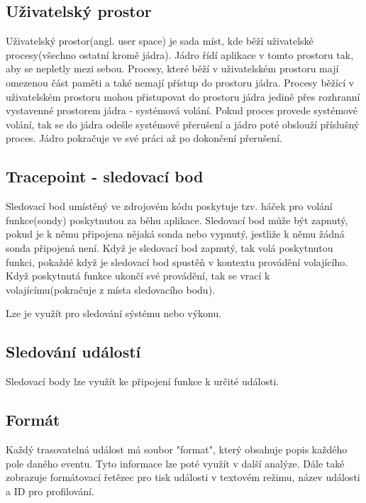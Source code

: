 \subsection*{Uživatelský prostor}
Uživatelský prostor(angl. user space) je sada míst, kde běží uživatelské procesy(všechno ostatní kromě jádra). Jádro řídí aplikace v tomto prostoru tak, aby se nepletly mezi sebou.
Procesy, které běží v uživatelském prostoru mají omezenou část paměti a také nemají přístup do prostoru jádra. Procesy běžící v uživatelském prostoru mohou přistupovat do prostoru jádra
jedině přes rozhranní vystavenné prostorem jádra - systémová volání. Pokud proces provede systémové volání, tak se do jádra odešle systémové přerušení a jádro poté obslouží
příslušný proces. Jádro pokračuje ve své práci až po dokončení přerušení.

\iffalse
www.linfo.org/kernel_space.html
\fi

\subsection{Tracepoint - sledovací bod}
Sledovací bod umístěný ve zdrojovém kódu poskytuje tzv. háček pro volání funkce(sondy) poskytnutou za běhu aplikace. Sledovací bod může
být zapnutý, pokud je k němu připojena nějaká sonda nebo vypnutý, jestliže k němu žádná sonda připojená není. Když je sledovací bod
zapnutý, tak volá poskytnutou funkci, pokaždé když je sledovací bod spustěň v kontextu provádění volajícího. Když poskytnutá funkce
ukončí své provádění, tak se vrací k volajícímu(pokračuje z místa sledovacího bodu).

Lze je využít pro sledování sýstému nebo výkonu.

\iffalse
https://www.kernel.org/doc/Documentation/trace/tracepoints.rst
\fi

\subsection {Sledování událostí}
Sledovací body lze využít ke připojení funkce k určité události.

\subsection*{Formát}
Každý trasovatelná událost má soubor "format", který obsahuje popis každého pole daného eventu. Tyto informace lze poté využít v další
analýze. Dále také zobrazuje formátovací řetězec pro tisk události v textovém režimu, název události a ID pro profilování.

